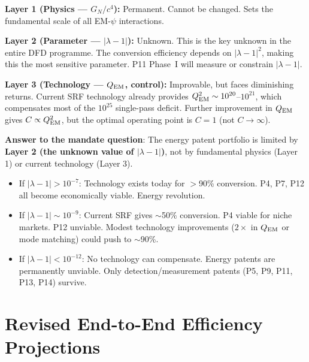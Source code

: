 \documentclass[11pt]{article}
\newcommand{\lambdaone}{|\lambda{-}1|}
\newcommand{\QEM}{Q_{\rm EM}}
\newcommand{\GN}{G_N}
\begin{document}
\begin{tcolorbox}[colback=blue!5!white, colframe=blue!60!black,
  title=\textbf{W3i9 FINAL ASSESSMENT: Three-Layer Bottleneck}]

\textbf{Layer 1 (Physics --- $\GN/c^4$):} Permanent. Cannot be changed.
Sets the fundamental scale of all EM-$\psi$ interactions.

\textbf{Layer 2 (Parameter --- $\lambdaone$):} Unknown. This is the
key unknown in the entire DFD programme. The conversion efficiency
depends on $\lambdaone^2$, making this the most sensitive parameter.
P11 Phase~I will measure or constrain $\lambdaone$.

\textbf{Layer 3 (Technology --- $\QEM$, control):} Improvable, but
faces diminishing returns. Current SRF technology already provides
$\QEM^2 \sim 10^{20}$--$10^{21}$, which compensates most of the
$10^{25}$ single-pass deficit. Further improvement in $\QEM$ gives
$C \propto \QEM^2$, but the optimal operating point is $C = 1$ (not
$C \to \infty$).

\bigskip
\textbf{Answer to the mandate question}: The energy patent portfolio
is limited by \textbf{Layer 2 (the unknown value of $\lambdaone$)},
not by fundamental physics (Layer 1) or current technology (Layer 3).

\begin{itemize}[nosep]
\item If $\lambdaone > 10^{-7}$: Technology exists today for $>$90\%
  conversion. P4, P7, P12 all become economically viable. Energy
  revolution.
\item If $\lambdaone \sim 10^{-9}$: Current SRF gives $\sim$50\%
  conversion. P4 viable for niche markets. P12 unviable. Modest
  technology improvements ($2\times$ in $\QEM$ or mode matching)
  could push to $\sim$90\%.
\item If $\lambdaone < 10^{-12}$: No technology can compensate.
  Energy patents are permanently unviable. Only detection/measurement
  patents (P5, P9, P11, P13, P14) survive.
\end{itemize}
\end{tcolorbox}

\section{Revised End-to-End Efficiency Projections}
\label{sec:e2e-projections}
\end{document}
